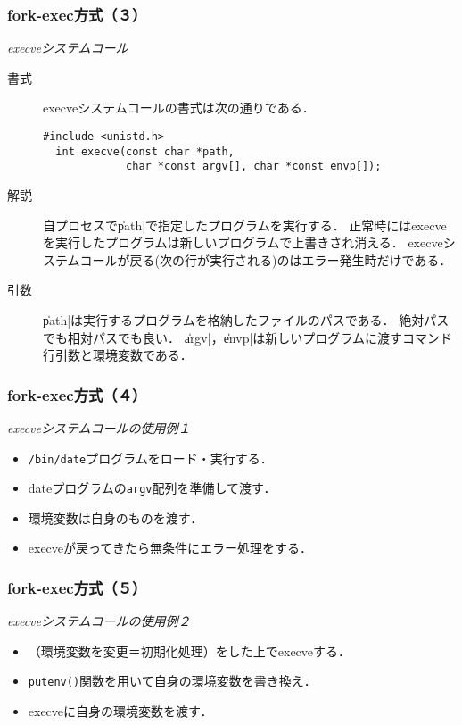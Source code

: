 \documentclass{beamer}                 %
\begin{document}
\begin{frame}[fragile]
  \frametitle{fork-exec方式（３）}
  \emph{execveシステムコール} \\
  \begin{description}
  \item[書式] execveシステムコールの書式は次の通りである．
\begin{lstlisting}[numbers=none]
  #include <unistd.h>
  int execve(const char *path,
             char *const argv[], char *const envp[]);
\end{lstlisting}

  \item[解説]
    自プロセスで\|path|で指定したプログラムを実行する．
    正常時にはexecveを実行したプログラムは新しいプログラムで上書きされ消える．
    execveシステムコールが戻る(次の行が実行される)のはエラー発生時だけである．

  \item[引数]
    \|path|は実行するプログラムを格納したファイルのパスである．
    絶対パスでも相対パスでも良い．
    \|argv|，\|envp|は新しいプログラムに渡すコマンド行引数と環境変数である．
  \end{description}
  \vfill
\end{frame}

\begin{frame}[fragile]
  \frametitle{fork-exec方式（４）}
  \emph{execveシステムコールの使用例１} \\
  \begin{itemize}
  \item \texttt{/bin/date}プログラムをロード・実行する．
  \item dateプログラムの\texttt{argv}配列を準備して渡す．
  \item 環境変数は自身のものを渡す．
  \item execveが戻ってきたら無条件にエラー処理をする．
  \end{itemize}
  \vfill
\end{frame}

\begin{frame}[fragile]
  \frametitle{fork-exec方式（５）}
  \emph{execveシステムコールの使用例２} \\
  \begin{itemize}
  \item （環境変数を変更＝初期化処理）をした上でexecveする．
  \item \texttt{putenv()}関数を用いて自身の環境変数を書き換え．
  \item execveに自身の環境変数を渡す．
  \end{itemize}
  \vfill
\end{frame}
\end{document}
